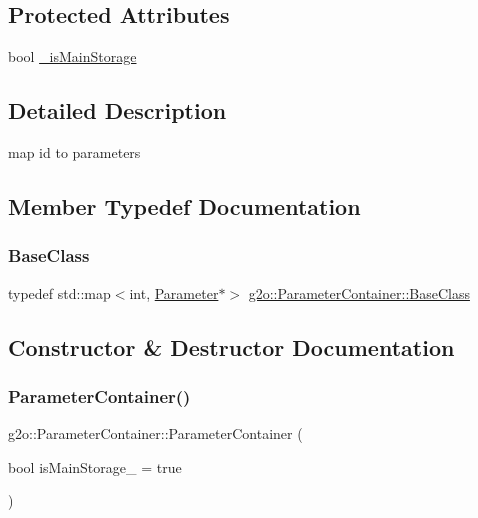 \subsection*{Protected Attributes}
\begin{DoxyCompactItemize}
\item 
bool \mbox{\hyperlink{classg2o_1_1_parameter_container_a2ff1e92bc6a486d48043e2191807bd47}{\+\_\+is\+Main\+Storage}}
\end{DoxyCompactItemize}


\subsection{Detailed Description}
map id to parameters 

\subsection{Member Typedef Documentation}
\mbox{\label{classg2o_1_1_parameter_container_a200fdfdce01f7fb5f96e02a8ddf666ac}} 
\subsubsection{\texorpdfstring{Base\+Class}{BaseClass}}
{\footnotesize\ttfamily typedef std\+::map$<$int, \mbox{\hyperlink{classg2o_1_1_parameter}{Parameter}}$\ast$$>$ \mbox{\hyperlink{classg2o_1_1_parameter_container_a200fdfdce01f7fb5f96e02a8ddf666ac}{g2o\+::\+Parameter\+Container\+::\+Base\+Class}}}



\subsection{Constructor \& Destructor Documentation}
\mbox{\label{classg2o_1_1_parameter_container_a6047d0206008b5cbb366be0fe03246b4}} 
\subsubsection{\texorpdfstring{Parameter\+Container()}{ParameterContainer()}}
{\footnotesize\ttfamily g2o\+::\+Parameter\+Container\+::\+Parameter\+Container (\begin{DoxyParamCaption}\item[{bool}]{is\+Main\+Storage\+\_\+ = {\ttfamily true} }\end{DoxyParamCaption})}

